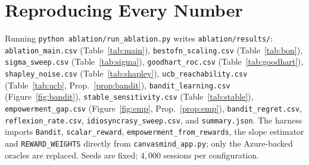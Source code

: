 \documentclass[11pt]{article}
\newcommand{\code}[1]{\texttt{\small #1}}
\newcommand{\file}[1]{\textcolor{accent}{\texttt{\small #1}}}
\theoremstyle{plain}
\theoremstyle{definition}
\begin{document}
\section{Reproducing Every Number}
Running \code{python ablation/run\_ablation.py} writes \file{ablation/results/}:
\file{ablation\_main.csv} (Table~\ref{tab:main}), \file{bestofn\_scaling.csv}
(Table~\ref{tab:bon}), \file{sigma\_sweep.csv} (Table~\ref{tab:sigma}),
\file{goodhart\_roc.csv} (Table~\ref{tab:goodhart}), \file{shapley\_noise.csv}
(Table~\ref{tab:shapley}), \file{ucb\_reachability.csv} (Table~\ref{tab:ucb},
Prop.~\ref{prop:bandit}), \file{bandit\_learning.csv} (Figure~\ref{fig:bandit}),
\file{stable\_sensitivity.csv} (Table~\ref{tab:stable}),
\file{empowerment\_gap.csv} (Figure~\ref{fig:emp}, Prop.~\ref{prop:emp}),
\file{bandit\_regret.csv}, \file{reflexion\_rate.csv},
\file{idiosyncrasy\_sweep.csv}, and \file{summary.json}. The harness imports
\code{Bandit}, \code{scalar\_reward}, \code{empowerment\_from\_rewards}, the
slope estimator and \code{REWARD\_WEIGHTS} directly from
\file{canvasmind\_app.py}; only the Azure-backed oracles are replaced. Seeds are
fixed; $4{,}000$ sessions per configuration.
\end{document}
